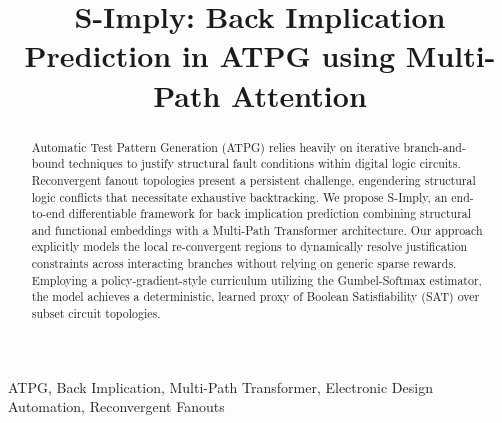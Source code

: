 \documentclass[conference]{IEEEtran}
\begin{document}
\title{S-Imply: Back Implication Prediction in ATPG using Multi-Path Attention}

\author{
   \and
}

\maketitle

\begin{abstract}
   Automatic Test Pattern Generation (ATPG) relies heavily on iterative branch-and-bound techniques to justify structural fault conditions within digital logic circuits. Reconvergent fanout topologies present a persistent challenge, engendering structural logic conflicts that necessitate exhaustive backtracking. We propose S-Imply, an end-to-end differentiable framework for back implication prediction combining structural and functional embeddings with a Multi-Path Transformer architecture. Our approach explicitly models the local re-convergent regions to dynamically resolve justification constraints across interacting branches without relying on generic sparse rewards. Employing a policy-gradient-style curriculum utilizing the Gumbel-Softmax estimator, the model achieves a deterministic, learned proxy of Boolean Satisfiability (SAT) over subset circuit topologies.
\end{abstract}

\begin{IEEEkeywords}
   ATPG, Back Implication, Multi-Path Transformer, Electronic Design Automation, Reconvergent Fanouts
\end{IEEEkeywords}
\end{document}
